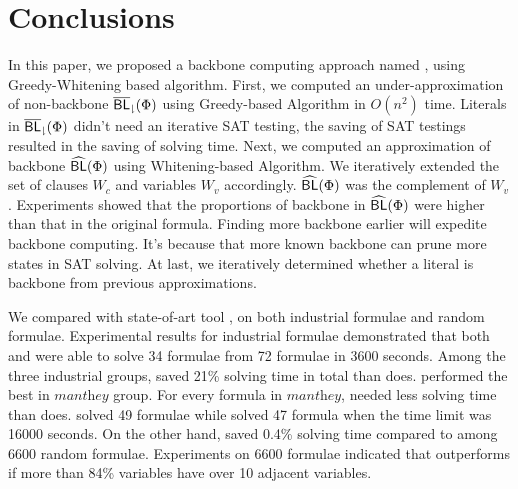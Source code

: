 \section{Conclusions}\label{sec:conc}



In this paper, we proposed a backbone computing approach named \tool, using Greedy-Whitening based algorithm.
First, we computed an under-approximation of non-backbone ${\sf \overline{BL}_\downharpoonright}(\Phi)$ using Greedy-based Algorithm in $O(n^2)$ time. Literals in ${\sf \overline{BL}_\downharpoonright}(\Phi)$ didn't need an iterative SAT testing, the saving of SAT testings resulted in the saving of solving time.
Next, we computed an approximation of backbone ${\sf \widehat{BL}}(\Phi)$ using Whitening-based Algorithm. We iteratively extended the set of clauses $W_c$ and variables $W_v$ accordingly. ${\sf \widehat{BL}}(\Phi)$ was the complement of $W_v$. Experiments showed that the proportions of backbone in ${\sf \widehat{BL}}(\Phi)$ were higher than that in the original formula. Finding more backbone earlier will expedite backbone computing. It's because that more known backbone can prune more states in SAT solving.
At last, we iteratively determined whether a literal is backbone from previous approximations.

We compared \tool with state-of-art tool \minibones, on both industrial formulae and random formulae.
Experimental results for industrial formulae demonstrated that both \tool and \minibones were able to solve 34 formulae from 72 formulae in 3600 seconds. Among the three industrial groups, \tool saved 21\% solving time in total than \minibones does. \tool performed the best in $\textit{manthey}$ group. For every formula in $\textit{manthey}$, \tool needed less solving time than \minibones does.
\tool solved 49 formulae while \minibones solved 47 formula when the time limit was 16000 seconds.
On the other hand, \tool saved 0.4\% solving time compared to \minibones among 6600 random formulae.
Experiments on 6600 formulae indicated that \tool outperforms \minibones if more than 84\% variables have over 10 adjacent variables.

